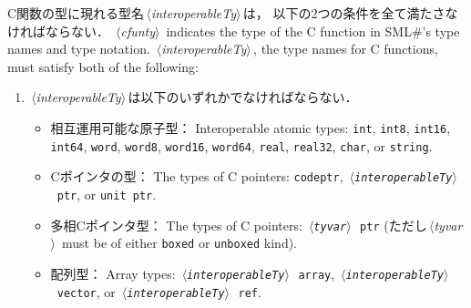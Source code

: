 \documentclass{jbook}
\newcommand{\txt}[2]{#2}
\newcommand{\smlsharp}{SML\#}
\newcommand{\nonterm}[1]{\mbox{$\,\langle$}{\it #1}\mbox{$\rangle\,$}}
\newcommand{\term}[1]{\mbox{{\tt #1}}}
\begin{document}
\ifjp%
	C関数の型に現れる型名\nonterm{interoperableTy}は，
以下の2つの条件を全て満たさなければならない．
\else%
	\nonterm{cfunty} indicates the type of the C function
in \smlsharp{}'s type names and type notation.
	\nonterm{interoperableTy}, the type names for C functions,
must satisfy both of the following:
\fi%
\begin{enumerate}
\item
	\nonterm{interoperableTy}は以下のいずれかでなければならない．
\begin{itemize}
\item
\ifjp%
        相互運用可能な原子型：
\else%
	Interoperable atomic types:
\fi%
\term{int},
\term{int8},
\term{int16},
\term{int64},
\term{word},
\term{word8},
\term{word16},
\term{word64},
\term{real},
\term{real32},
\term{char},
\txt{または}{or}
\term{string}.

\item
\ifjp%
	Cポインタの型：
\else%
	The types of C pointers:
\fi%
\term{codeptr},
\term{\nonterm{interoperableTy}\ ptr},
\txt{または}{or}
\term{unit ptr}.

\item
\ifjp%
	多相Cポインタ型：
\else%
	The types of C pointers:
\fi%
\term{\nonterm{tyvar}\ ptr}
(ただし\txt{\nonterm{tyvar}は\term{boxed}カインドまたは\term{unboxed}カインドを
持つものに限る}
{\nonterm{tyvar} must be of either \term{boxed} or \term{unboxed} kind}).

\item
\ifjp%
	配列型：
\else%
	Array types:
\fi%
\term{\nonterm{interoperableTy}\ array},
\term{\nonterm{interoperableTy}\ vector},
\txt{または}{or}
\term{\nonterm{interoperableTy}\ ref}.


\end{itemize}
\end{enumerate}
\end{document}
